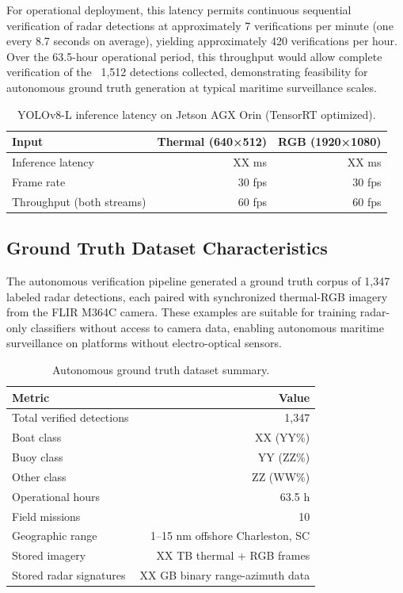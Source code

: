 \documentclass[twocolumn, 10pt]{article}
\begin{document}
For operational deployment, this latency permits continuous sequential verification of radar detections at approximately 7 verifications per minute (one every 8.7 seconds on average), yielding approximately 420 verifications per hour. Over the 63.5-hour operational period, this throughput would allow complete verification of the ~1,512 detections collected, demonstrating feasibility for autonomous ground truth generation at typical maritime surveillance scales.

\begin{table}[t]
\caption{YOLOv8-L inference latency on Jetson AGX Orin (TensorRT optimized).}
\label{tab:inference_latency}
\centering
\small
\begin{tabular}{@{}lrr@{}}
\toprule
Input & Thermal (640×512) & RGB (1920×1080) \\
\midrule
Inference latency & XX ms & XX ms \\
Frame rate & 30 fps & 30 fps \\
Throughput (both streams) & 60 fps & 60 fps \\
\bottomrule
\end{tabular}
\end{table}

\subsection{Ground Truth Dataset Characteristics}

The autonomous verification pipeline generated a ground truth corpus of 1,347 labeled radar detections, each paired with synchronized thermal-RGB imagery from the FLIR M364C camera. These examples are suitable for training radar-only classifiers without access to camera data, enabling autonomous maritime surveillance on platforms without electro-optical sensors.

\begin{table}[t]
\caption{Autonomous ground truth dataset summary.}
\label{tab:dataset_summary}
\centering
\small
\begin{tabular}{@{}lr@{}}
\toprule
Metric & Value \\
\midrule
Total verified detections & 1,347 \\
Boat class & XX (YY\%) \\
Buoy class & YY (ZZ\%) \\
Other class & ZZ (WW\%) \\
\midrule
Operational hours & 63.5 h \\
Field missions & 10 \\
Geographic range & 1--15 nm offshore Charleston, SC \\
\midrule
Stored imagery & XX TB thermal + RGB frames \\
Stored radar signatures & XX GB binary range-azimuth data \\
\bottomrule
\end{tabular}
\end{table}
\end{document}
